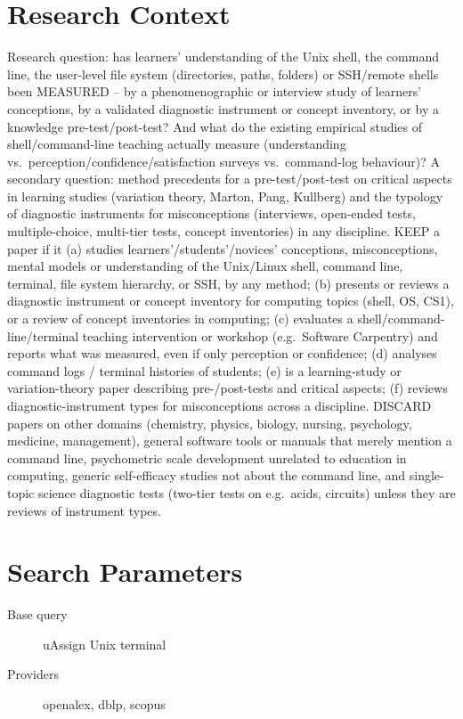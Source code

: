 \documentclass{article}
\begin{document}
\section{Research Context}
Research question: has learners' understanding of the Unix shell, the
command line, the user-level file system (directories, paths, folders)
or SSH/remote shells been MEASURED -- by a phenomenographic or interview
study of learners' conceptions, by a validated diagnostic instrument or
concept inventory, or by a knowledge pre-test/post-test? And what do the
existing empirical studies of shell/command-line teaching actually
measure (understanding vs.~perception/confidence/satisfaction surveys
vs.~command-log behaviour)? A secondary question: method precedents for
a pre-test/post-test on critical aspects in learning studies (variation
theory, Marton, Pang, Kullberg) and the typology of diagnostic
instruments for misconceptions (interviews, open-ended tests,
multiple-choice, multi-tier tests, concept inventories) in any
discipline. KEEP a paper if it (a) studies learners'/students'/novices'
conceptions, misconceptions, mental models or understanding of the
Unix/Linux shell, command line, terminal, file system hierarchy, or SSH,
by any method; (b) presents or reviews a diagnostic instrument or
concept inventory for computing topics (shell, OS, CS1), or a review of
concept inventories in computing; (c) evaluates a
shell/command-line/terminal teaching intervention or workshop
(e.g.~Software Carpentry) and reports what was measured, even if only
perception or confidence; (d) analyses command logs / terminal histories
of students; (e) is a learning-study or variation-theory paper
describing pre-/post-tests and critical aspects; (f) reviews
diagnostic-instrument types for misconceptions across a discipline.
DISCARD papers on other domains (chemistry, physics, biology, nursing,
psychology, medicine, management), general software tools or manuals
that merely mention a command line, psychometric scale development
unrelated to education in computing, generic self-efficacy studies not
about the command line, and single-topic science diagnostic tests
(two-tier tests on e.g.~acids, circuits) unless they are reviews of
instrument types.

\section{Search Parameters}

\begin{description}
\item[Base query] uAssign Unix terminal
\item[Providers] openalex, dblp, scopus
\end{description}
\end{document}
